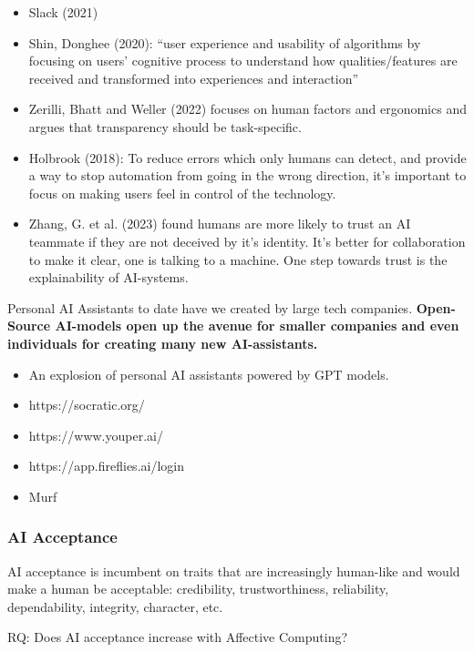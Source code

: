 \documentclass[
  letterpaper,
  DIV=11,
  numbers=noendperiod]{scrartcl}
\providecommand{\tightlist}{%
  \setlength{\itemsep}{0pt}\setlength{\parskip}{0pt}}\usepackage{longtable,booktabs,array}
\begin{document}
\begin{itemize}
\item
  Slack (2021)
\item
  Shin, Donghee (2020): ``user experience and usability of algorithms by
  focusing on users' cognitive process to understand how
  qualities/features are received and transformed into experiences and
  interaction''
\item
  Zerilli, Bhatt and Weller (2022) focuses on human factors and
  ergonomics and argues that transparency should be task-specific.
\item
  Holbrook (2018): To reduce errors which only humans can detect, and
  provide a way to stop automation from going in the wrong direction,
  it's important to focus on making users feel in control of the
  technology.
\item
  Zhang, G. et al. (2023) found humans are more likely to trust an AI
  teammate if they are not deceived by it's identity. It's better for
  collaboration to make it clear, one is talking to a machine. One step
  towards trust is the explainability of AI-systems.
\end{itemize}

Personal AI Assistants to date have we created by large tech companies.
\textbf{Open-Source AI-models open up the avenue for smaller companies
and even individuals for creating many new AI-assistants.}

\begin{itemize}
\tightlist
\item
  An explosion of personal AI assistants powered by GPT models.
\item
  https://socratic.org/
\item
  https://www.youper.ai/
\item
  https://app.fireflies.ai/login
\item
  Murf
\end{itemize}

\subsubsection{AI Acceptance}\label{ai-acceptance}

AI acceptance is incumbent on traits that are increasingly human-like
and would make a human be acceptable: credibility, trustworthiness,
reliability, dependability, integrity, character, etc.

RQ: Does AI acceptance increase with Affective Computing?
\end{document}
